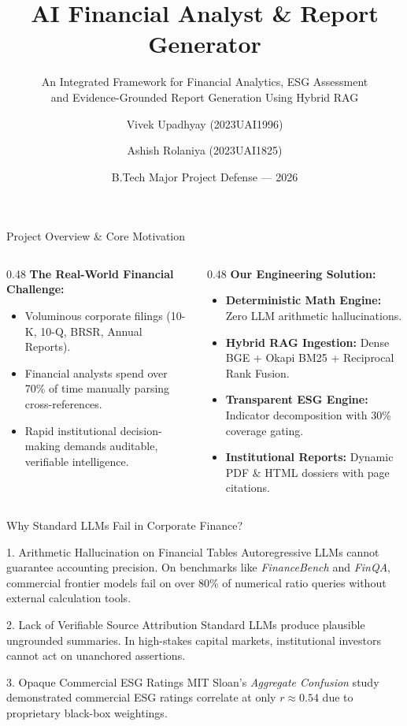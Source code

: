 \documentclass[aspectratio=169,10pt]{beamer}
\title[AI Financial Analyst \& Report Generator]{AI Financial Analyst \& Report Generator}
\subtitle{An Integrated Framework for Financial Analytics, ESG Assessment \\ and Evidence-Grounded Report Generation Using Hybrid RAG}
\author[Vivek \& Ashish]{Vivek Upadhyay (2023UAI1996) \and Ashish Rolaniya (2023UAI1825)}
\institute[MNIT Jaipur]{Department of Artificial Intelligence and Data Engineering \\ Malaviya National Institute of Technology (MNIT) Jaipur, India}
\date{B.Tech Major Project Defense --- 2026}
\begin{document}
\frame{\titlepage}

\begin{frame}{Project Overview \& Core Motivation}
\begin{columns}[T]
\begin{column}{0.48\textwidth}
\textbf{The Real-World Financial Challenge:}
\begin{itemize}
    \item Voluminous corporate filings (10-K, 10-Q, BRSR, Annual Reports).
    \item Financial analysts spend over 70\% of time manually parsing cross-references.
    \item Rapid institutional decision-making demands auditable, verifiable intelligence.
\end{itemize}
\end{column}
\begin{column}{0.48\textwidth}
\textbf{Our Engineering Solution:}
\begin{itemize}
    \item \textbf{Deterministic Math Engine:} Zero LLM arithmetic hallucinations.
    \item \textbf{Hybrid RAG Ingestion:} Dense BGE + Okapi BM25 + Reciprocal Rank Fusion.
    \item \textbf{Transparent ESG Engine:} Indicator decomposition with 30\% coverage gating.
    \item \textbf{Institutional Reports:} Dynamic PDF \& HTML dossiers with page citations.
\end{itemize}
\end{column}
\end{columns}
\end{frame}

\begin{frame}{Why Standard LLMs Fail in Corporate Finance?}
\begin{block}{1. Arithmetic Hallucination on Financial Tables}
Autoregressive LLMs cannot guarantee accounting precision. On benchmarks like \textit{FinanceBench} and \textit{FinQA}, commercial frontier models fail on over 80\% of numerical ratio queries without external calculation tools.
\end{block}
\begin{block}{2. Lack of Verifiable Source Attribution}
Standard LLMs produce plausible ungrounded summaries. In high-stakes capital markets, institutional investors cannot act on unanchored assertions.
\end{block}
\begin{block}{3. Opaque Commercial ESG Ratings}
MIT Sloan's \textit{Aggregate Confusion} study demonstrated commercial ESG ratings correlate at only $r \approx 0.54$ due to proprietary black-box weightings.
\end{block}
\end{frame}
\end{document}
